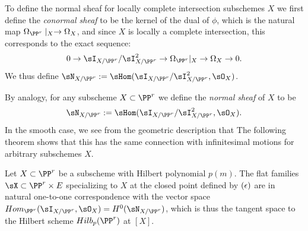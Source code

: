 
To define the normal sheaf for locally complete intersection subschemes $X$ we first define the \emph{conormal sheaf}
to be the kernel of the dual  of $\phi$, which is the natural map $\Omega_{\PP^r}\mid_X \to \Omega_X$,
and since $X$ is locally a complete intersection, this corresponds to the exact sequence:
$$
0\to \sI_{X/\PP^r}/\sI_{X/\PP^r}^2 \to \Omega_{\PP^r}|_X \to \Omega_X \to 0.
$$
We thus define $\sN_{X/\PP^r} := \sHom(\sI_{X/\PP^r}/\sI_{X/\PP^r}^2, \sO_X)$.

By analogy, for any subscheme $X\subset \PP^r$ we define the \emph{normal sheaf}
of $X$ to be
$$
\sN_{X/\PP^r} := \sHom(\sI_{X/\PP^r}/\sI_{X/\PP^r}^2, \sO_X).
$$
In the smooth case, we see from the geometric description that  The following theorem shows that this
has the same connection with infinitesimal motions for arbitrary subschemes $X$.


\begin{theorem}\label{tangent space of Hilb}
Let $X\subset \PP^r$ be a subscheme with Hilbert polynomial $p(m)$. The flat families 
$\sX \subset \PP^r\times E$ specializing to $X$ at the closed point defined by $(\eps)$
are in natural one-to-one correspondence with the vector space $Hom_{\PP^r}(\sI_{X/\PP^r}, \sO_X) = H^0(\sN_{X/\PP^r})$, which is thus the tangent space to the Hilbert scheme $Hilb_{p}(\PP^r)$ at $[X]$.
\end{theorem}

